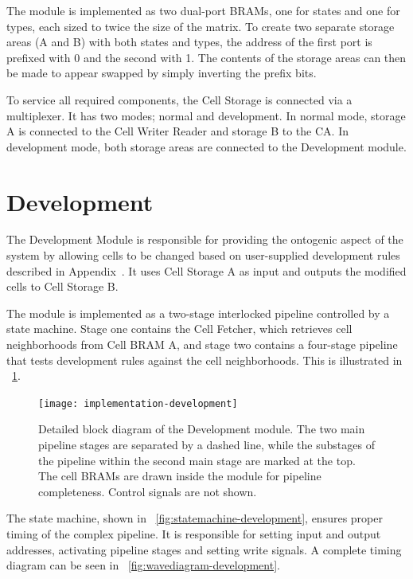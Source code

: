 The module is implemented as two dual-port BRAMs, one for states and one for types, each sized to twice the size of the matrix.
To create two separate storage areas (A and B) with both states and types, the address of the first port is prefixed with 0 and the second with 1.
The contents of the storage areas can then be made to appear swapped by simply inverting the prefix bits.

To service all required components, the Cell Storage is connected via a multiplexer.
It has two modes; normal and development.
In normal mode, storage A is connected to the Cell Writer Reader and storage B to the CA.
In development mode, both storage areas are connected to the Development module.



\section{Development}
\label{sec:development}

The Development Module is responsible for providing the ontogenic aspect of the system by allowing cells to be changed based on user-supplied development rules described in Appendix~.
It uses Cell Storage A as input and outputs the modified cells to Cell Storage B.

The module is implemented as a two-stage interlocked pipeline controlled by a state machine.
Stage one contains the Cell Fetcher, which retrieves cell neighborhoods from Cell BRAM A, and stage two contains a four-stage pipeline that tests development rules against the cell neighborhoods.
This is illustrated in \figurename~\ref{fig:implementation-development}.

\begin{figure}[!ht]
    \hspace{-0.05\textwidth}
    \texttt{[image: implementation-development]}
    \caption[Development module]{
        Detailed block diagram of the Development module.
        The two main pipeline stages are separated by a dashed line,
        while the substages of the pipeline within the second main stage are marked at the top.
        The cell BRAMs are drawn inside the module for pipeline completeness.
        Control signals are not shown.
    }
    \label{fig:implementation-development}
\end{figure}

The state machine, shown in \figurename~\ref{fig:statemachine-development}, ensures proper timing of the complex pipeline.
It is responsible for setting input and output addresses, activating pipeline stages and setting write signals.
A complete timing diagram can be seen in \figurename~\ref{fig:wavediagram-development}.

